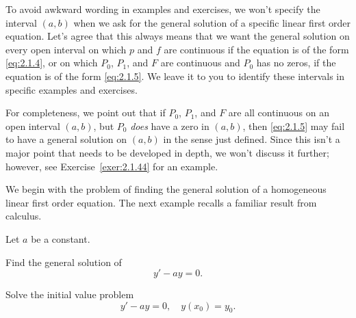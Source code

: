 To avoid awkward wording in examples and exercises, we won't specify the interval $(a,b)$ when we
ask for the general solution of a specific linear first order equation. Let's agree that this always
means that we want the general solution on every open interval on which $p$ and $f$ are continuous
if the equation is of the form \eqref{eq:2.1.4}, or on which $P_{0}$, $P_{1}$, and $F$ are
continuous and $P_{0}$ has no zeros, if the equation is of the form \eqref{eq:2.1.5}. We leave it to
you to identify these intervals in specific examples and exercises.

For completeness, we point out that if $P_{0}$, $P_{1}$, and $F$ are all continuous on an open
interval $(a,b)$, but $P_{0}$ {\color{blue}\it does\/} have a zero in $(a,b)$, then \eqref{eq:2.1.5}
may fail to have a general solution on $(a,b)$ in the sense just defined. Since this isn't a major
point that needs to be developed in depth, we won't discuss it further; however, see
Exercise~\ref{exer:2.1.44} for an example.


\noindent
We begin with the problem of finding the general solution of a homogeneous linear first order
equation. The next example recalls a familiar result from calculus.

\begin{example}
  \label{example:2.1.3} \rm Let $a$ be a constant.
  \begin{alist}
    \item %
    Find the general solution of
    \begin{equation}
      y'-ay=0.\label{eq:2.1.6}
    \end{equation}

    \item %
    Solve the initial value problem
    \[
      y'-ay=0,\quad y(x_{0})=y_{0}.
    \]
  \end{alist}
\end{example}

